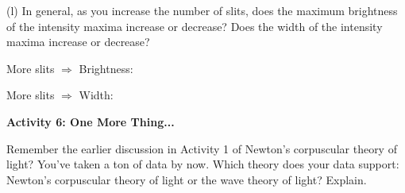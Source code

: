 (l) In general, as you increase the number of slits, does the maximum brightness of the intensity maxima increase or decrease? Does the width of the intensity maxima increase or decrease?


\medskip
\hspace{0.5in} More slits $\Longrightarrow$ Brightness:
\medskip

\hspace{0.5in} More slits $\Longrightarrow$ Width:
\medskip


\textbf{Activity 6: One More Thing...}

Remember the earlier discussion in Activity 1 of Newton's corpuscular theory of
light? You've taken a ton of data by now.  Which theory does your data support: Newton's corpuscular theory of light or the wave theory of light?
Explain.
\answerspace{\fill}
